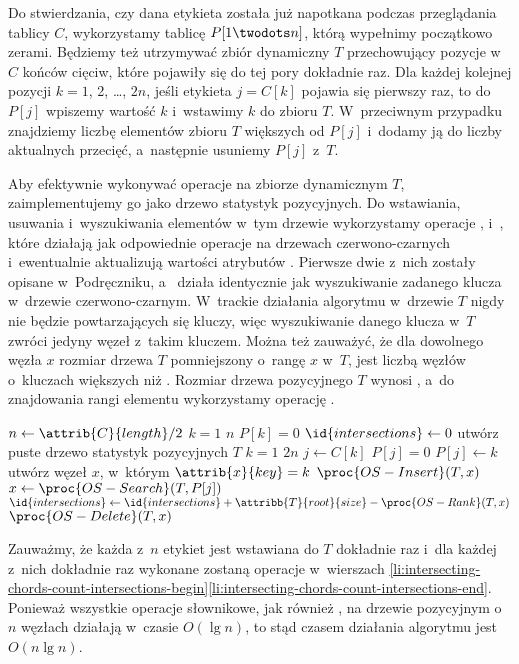 Do stwierdzania, czy dana etykieta została już napotkana podczas przeglądania tablicy $C$, wykorzystamy tablicę $P[1\twodots n]$, którą wypełnimy początkowo zerami.
Będziemy też utrzymywać zbiór dynamiczny $T$ przechowujący pozycje w~$C$ końców cięciw, które pojawiły się do tej pory dokładnie raz.
Dla każdej kolejnej pozycji $k=1$, 2, \dots, $2n$, jeśli etykieta $j=C[k]$ pojawia się pierwszy raz, to do $P[j]$ wpiszemy wartość $k$ i~wstawimy $k$ do zbioru $T$.
W~przeciwnym przypadku znajdziemy liczbę elementów zbioru $T$ większych od $P[j]$ i~dodamy ją do liczby aktualnych przecięć, a~następnie usuniemy $P[j]$ z~$T$.

Aby efektywnie wykonywać operacje na zbiorze dynamicznym $T$, zaimplementujemy go jako drzewo statystyk pozycyjnych.
Do wstawiania, usuwania i~wyszukiwania elementów w~tym drzewie wykorzystamy operacje ,  i~, które działają jak odpowiednie operacje na drzewach czerwono-czarnych i~ewentualnie aktualizują wartości atrybutów .
Pierwsze dwie z~nich zostały opisane w~Podręczniku, a~ działa identycznie jak wyszukiwanie zadanego klucza w~drzewie czerwono-czarnym.
W~trackie działania algorytmu w~drzewie $T$ nigdy nie będzie powtarzających się kluczy, więc wyszukiwanie danego klucza w~$T$ zwróci jedyny węzeł z~takim kluczem.
Można też zauważyć, że dla dowolnego węzła $x$ rozmiar drzewa $T$ pomniejszony o~rangę $x$ w~$T$, jest liczbą węzłów o~kluczach większych niż .
Rozmiar drzewa pozycyjnego $T$ wynosi , a~do znajdowania rangi elementu wykorzystamy operację .
\begin{codebox}
\li $n\gets\attrib{C}{length}/2$
\li	\For $k=1$ \To $n$
\li		\Do $P[k]=0$
		\End
\li	$\id{intersections}\gets0$
\li	utwórz puste drzewo statystyk pozycyjnych $T$
\li	\For $k=1$ \To $2n$
\li		\Do $j\gets C[k]$
\li			\If $P[j]=0$
\li				\Then $P[j]\gets k$
\li					utwórz węzeł $x$, w~którym $\attrib{x}{key}=k$
\li					$\proc{OS-Insert}(T,x)$
\li				\Else $x\gets\proc{OS-Search}(T,P[j])$ \label{li:intersecting-chords-count-intersections-begin}
\li					$\id{intersections}\gets\id{intersections}+\attribb{T}{root}{size}-\proc{OS-Rank}(T,x)$
\li					$\proc{OS-Delete}(T,x)$
				\End \label{li:intersecting-chords-count-intersections-end}
		\End
\li	\Return {}
\end{codebox}

Zauważmy, że każda z~$n$ etykiet jest wstawiana do $T$ dokładnie raz i~dla każdej z~nich dokładnie raz wykonane zostaną operacje w~wierszach \ref{li:intersecting-chords-count-intersections-begin}\nbendash\ref{li:intersecting-chords-count-intersections-end}.
Ponieważ wszystkie operacje słownikowe, jak również , na drzewie pozycyjnym o~$n$ węzłach działają w~czasie $O(\lg n)$, to stąd czasem działania algorytmu jest $O(n\lg n)$.
